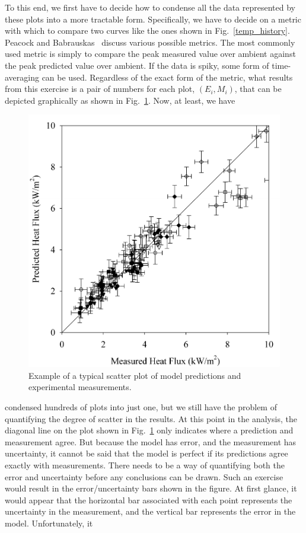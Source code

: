 To this end, we first have to decide how to condense all the data represented by these plots into a more tractable form. Specifically, we
have to decide on a metric with which to compare two curves like the ones shown in Fig.~\ref{temp_history}. Peacock and
Babrauskas~\cite{Peacock:FSJ} discuss various possible metrics. The most commonly used metric is simply to compare the peak measured value over ambient against the peak
predicted value over ambient. If the data is spiky, some form of time-averaging can be used. Regardless of the exact form of the metric, what results from
this exercise is a pair of numbers for each plot, $(E_i,M_i)$, that can be depicted graphically as shown in Fig.~\ref{scatterplot}. Now, at least, we have
\begin{figure}[ht]
\begin{center}
\includegraphics[height=3.in]{FIGURES/scatterplot}
\end{center}
\caption[Sample scatter plot.]{Example of a typical scatter plot of model predictions and experimental measurements.}
\label{scatterplot}
\end{figure}
condensed hundreds of plots into just one, but we still have the problem of quantifying the degree of scatter in the results. At this point in the analysis, the
diagonal line on the plot shown in Fig.~\ref{scatterplot} only indicates where a prediction and measurement agree. But because the model has error, and
the measurement has uncertainty, it cannot be said that the model is perfect if its predictions agree exactly with measurements. There needs to be a way of quantifying
both the error and uncertainty before any conclusions can be drawn.
Such an exercise would result in the error/uncertainty bars shown in the figure. At first glance, it would appear that the
horizontal bar associated with each point represents the uncertainty in the measurement, and the vertical bar represents the error in the model. Unfortunately, it
